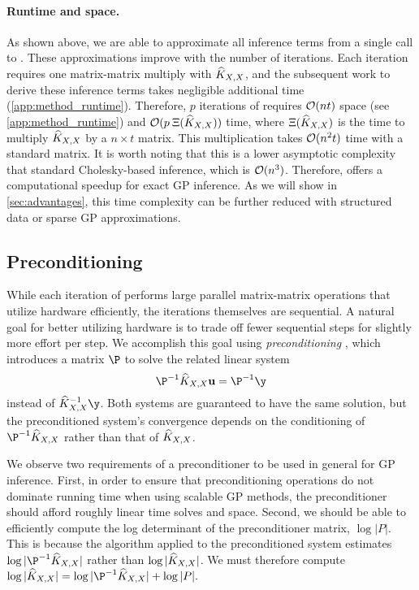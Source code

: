 \paragraph{Runtime and space.}
As shown above, we are able to approximate all inference terms from a single call to \mcgacro{}.
These approximations improve with the number of \mcgacro{} iterations.
Each iteration requires one matrix-matrix multiply with $\widehat{K}_{X,X}$, and the subsequent work to derive these inference terms takes negligible additional time (\autoref{app:method_runtime}).
Therefore, $p$ iterations of \mcgacro{} requires $\bigo{nt}$ space (see \autoref{app:method_runtime}) and $\bigo{p \: \mmm{\trainK}}$ time,
where $\Xi (\widehat{K}_{X,X})$ is the time to multiply $\widehat{K}_{X,X}$ by a $n \times t$ matrix.
This multiplication takes $\bigo{n^2 t}$ time with a standard matrix.
It is worth noting that this is a lower asymptotic complexity that standard Cholesky-based inference, which is $\bigo{n^3}$.
Therefore, \mmacro{} offers a computational speedup for exact GP inference.
As we will show in \autoref{sec:advantages}, this time complexity can be further reduced with structured data or sparse GP approximations.
%
\subsection{Preconditioning}
\label{sec:preconditioning}
While each iteration of \mcgacro{} performs large parallel matrix-matrix operations that utilize hardware efficiently, the iterations themselves are sequential.
A natural goal for better utilizing hardware is to trade off fewer sequential steps for slightly more effort per step.
We accomplish this goal using \emph{preconditioning} \cite{golub2012matrix,saad2003iterative,demmel1997applied,van2003iterative}, which introduces a matrix $\P$ to solve the related linear system
\begin{equation*}
  \P^{-1} \trainK \bu = \P^{-1}\y
\end{equation*}
instead of $\trainK^{-1} \y$.
Both systems are guaranteed to have the same solution, but the preconditioned system's convergence depends on the conditioning of $\P^{-1}\trainK$ rather than that of $\widehat{K}_{X,X}$.

We observe two requirements of a preconditioner to be used in general for GP inference. First, in order to ensure that preconditioning operations do not dominate running time when using scalable GP methods, the preconditioner should afford roughly linear time solves and space. Second, we should be able to efficiently compute the log determinant of the preconditioner matrix, $\log \vert P \vert$. This is because the \mcgacro{} algorithm applied to the preconditioned system estimates $\log \vert \P^{-1}\trainK \vert$ rather than $\log \vert \widehat{K}_{X,X} \vert$. We must therefore compute
$
  \label{eq:logdet_adjusted}
  \log \vert \trainK \vert = \log \vert \P^{-1}\trainK \vert + \log \vert P \vert.
$

